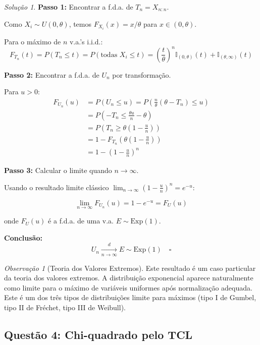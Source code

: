 \documentclass[12pt,a4paper]{article}
\theoremstyle{definition}
\theoremstyle{remark}
\newtheorem{solucao}{Solução}[section]
\newtheorem{observacao}{Observação}[section]
\begin{document}
\begin{solucao}
\textbf{Passo 1:} Encontrar a f.d.a. de $T_n = X_{n:n}$.

Como $X_i \sim U(0, \theta)$, temos $F_{X_i}(x) = x/\theta$ para $x \in (0, \theta)$.

Para o máximo de $n$ v.a.'s i.i.d.:
\[
F_{T_n}(t) = P(T_n \leq t) = P(\text{todas } X_i \leq t) = \left( \frac{t}{\theta} \right)^n \mathbb{I}_{(0,\theta)}(t) + \mathbb{I}_{(\theta, \infty)}(t)
\]

\textbf{Passo 2:} Encontrar a f.d.a. de $U_n$ por transformação.

Para $u > 0$:
\begin{align}
F_{U_n}(u) &= P(U_n \leq u) = P\left( \frac{n}{\theta} (\theta - T_n) \leq u \right) \\
&= P\left( -T_n \leq \frac{\theta u}{n} - \theta \right) \\
&= P\left( T_n \geq \theta \left( 1 - \frac{u}{n} \right) \right) \\
&= 1 - F_{T_n}\left(\theta \left(1 - \frac{u}{n}\right)\right) \\
&= 1 - \left(1 - \frac{u}{n}\right)^n
\end{align}

\textbf{Passo 3:} Calcular o limite quando $n \to \infty$.

Usando o resultado limite clássico $\lim_{n \to \infty} \left(1 - \frac{u}{n}\right)^n = e^{-u}$:

\[
\lim_{n \to \infty} F_{U_n}(u) = 1 - e^{-u} = F_U(u)
\]

onde $F_U(u)$ é a f.d.a. de uma v.a. $E \sim \text{Exp}(1)$.

\textbf{Conclusão:}
\[
U_n \xrightarrow[n \to \infty]{d} E \sim \text{Exp}(1) \quad \square
\]
\end{solucao}

\begin{observacao}[Teoria dos Valores Extremos]
Este resultado é um caso particular da teoria dos valores extremos. A distribuição exponencial aparece naturalmente como limite para o máximo de variáveis uniformes após normalização adequada. Este é um dos três tipos de distribuições limite para máximos (tipo I de Gumbel, tipo II de Fréchet, tipo III de Weibull).
\end{observacao}

\subsection{Questão 4: Chi-quadrado pelo TCL}
\end{document}
